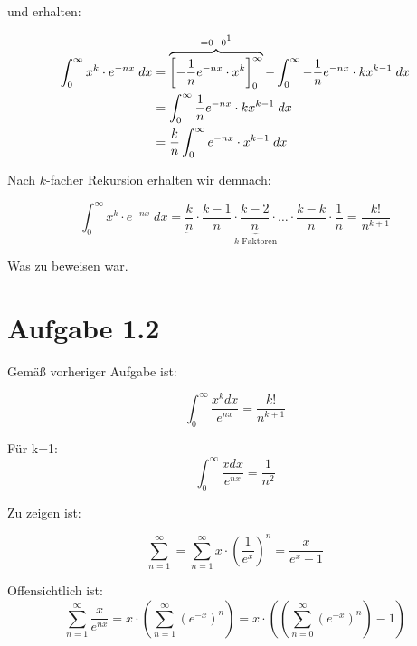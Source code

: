 \documentclass[a4paper,german,12pt,smallheadings]{scrartcl}
\begin{document}
und erhalten:

\begin{align*}
  \int_0^\infty x^k \cdot e^{-nx} \; dx  &= \overbrace{\left[-\frac{1}{n} e^{-nx} \cdot x^k\right]_0^\infty}^{=0-0\footnotemark[1]} - \int_0^\infty -\frac{1}{n}e^{-nx} \cdot kx^{k-1} \; dx \\
                                         &= \int_0^\infty \frac{1}{n}e^{-nx} \cdot kx^{k-1} \; dx \\
                                         &= \frac{k}{n} \int_0^\infty e^{-nx} \cdot x^{k-1} \; dx
\end{align*}


Nach $k$-facher Rekursion erhalten wir demnach:

\begin{equation*}
  \int_0^\infty x^k \cdot e^{-nx} \; dx = \underbrace{\frac{k}{n} \cdot \frac{k-1}{n} \cdot \frac{k-2}{n} \cdot \dots \cdot \frac{k-k}{n}}_{k\text{ Faktoren}} \cdot \frac{1}{n} = \frac{k!}{n^{k+1}}
\end{equation*}

Was zu beweisen war.


\section*{Aufgabe 1.2}

Gemäß vorheriger Aufgabe ist:

\begin{equation*}
\int_{0}^{\infty}\frac{x^kdx}{e^{nx}}=\frac{k!}{n^{k+1}}
\end{equation*}

Für k=1:
\begin{equation*}
\int_{0}^{\infty}\frac{xdx}{e^{nx}}=\frac{1}{n^2}
\end{equation*}

Zu zeigen ist:

\begin{equation*}
\sum_{n=1}^{\infty}=\sum_{n=1}^{\infty}x\cdot\left(\frac{1}{e^x}\right)^n=\frac{x}{e^x-1}
\end{equation*}

Offensichtlich ist:
\begin{equation*}
    \sum_{n=1}^\infty \frac{x}{e^{nx}} = x \cdot \left(\sum_{n=1}^\infty \left(e^{-x}\right)^n\right) = x \cdot \left(\left(\sum_{n=0}^\infty \left(e^{-x}\right)^n\right) - 1\right)
\end{equation*}
\end{document}
